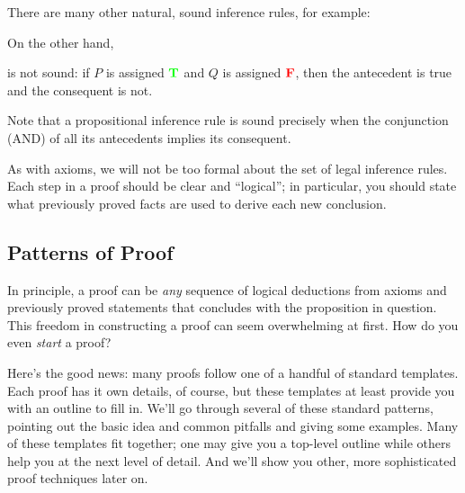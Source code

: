 There are many other natural, sound inference rules, for example:
\begin{rul*}
\end{rul*}

\begin{staffnotes}

\begin{rul*}
\end{rul*}

\end{staffnotes}

\begin{rul*}
\end{rul*}

On the other hand,
\begin{rul*}
\end{rul*}
\noindent is not sound: if $P$ is assigned $\textcolor{green}{\mathbf{T}}$ and $Q$ is assigned
$\textcolor{red}{\mathbf{F}}$, then the antecedent is true and the consequent is not.

Note that a propositional inference rule is sound precisely when the conjunction
(AND) of all its antecedents implies its consequent.

As with axioms, we will not be too formal about the set of legal inference
rules.  Each step in a proof should be clear and ``logical''; in
particular, you should state what previously proved facts are used to
derive each new conclusion.

\subsection{Patterns of Proof}

In principle, a proof can be \textit{any} sequence of logical
deductions from axioms and previously proved statements that concludes
with the proposition in question.  This freedom in constructing a
proof can seem overwhelming at first.  How do you even \textit{start}
a proof?

Here's the good news: many proofs follow one of a handful of standard
templates.  Each proof has it own details, of course, but these
templates at least provide you with an outline to fill in.  We'll go
through several of these standard patterns, pointing out the basic
idea and common pitfalls and giving some examples.  Many of these
templates fit together; one may give you a top-level outline while
others help you at the next level of detail.  And we'll show you
other, more sophisticated proof techniques later on.

